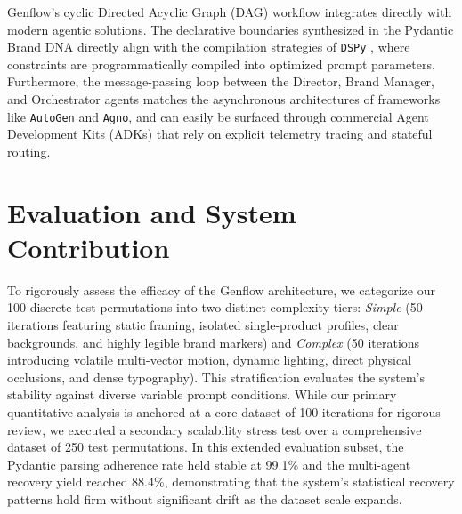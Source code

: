 \documentclass[sigconf]{acmart}
\begin{document}
Genflow's cyclic Directed Acyclic Graph (DAG) workflow integrates directly with modern agentic solutions. The declarative boundaries synthesized in the Pydantic Brand DNA directly align with the compilation strategies of \texttt{DSPy} \cite{khattab2024dspy}, where constraints are programmatically compiled into optimized prompt parameters. Furthermore, the message-passing loop between the Director, Brand Manager, and Orchestrator agents matches the asynchronous architectures of frameworks like \texttt{AutoGen} \cite{wu2024autogen} and \texttt{Agno}, and can easily be surfaced through commercial Agent Development Kits (ADKs) that rely on explicit telemetry tracing and stateful routing.

\section{Evaluation and System Contribution}

To rigorously assess the efficacy of the Genflow architecture, we categorize our 100 discrete test permutations into two distinct complexity tiers: \textit{Simple} (50 iterations featuring static framing, isolated single-product profiles, clear backgrounds, and highly legible brand markers) and \textit{Complex} (50 iterations introducing volatile multi-vector motion, dynamic lighting, direct physical occlusions, and dense typography). This stratification evaluates the system's stability against diverse variable prompt conditions. While our primary quantitative analysis is anchored at a core dataset of 100 iterations for rigorous review, we executed a secondary scalability stress test over a comprehensive dataset of 250 test permutations. In this extended evaluation subset, the Pydantic parsing adherence rate held stable at 99.1\% and the multi-agent recovery yield reached 88.4\%, demonstrating that the system's statistical recovery patterns hold firm without significant drift as the dataset scale expands.

\begin{table}[htbp]
\centering
\caption{Extended Evaluation Metrics: Baseline vs. Genflow Pipeline across Complexity Tiers.}
\label{tab:extended_metrics}
\end{table}
\end{document}

